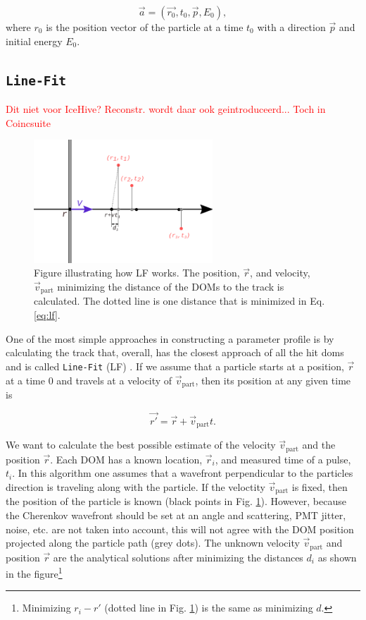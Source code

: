 \begin{equation}
\label{eq:vec}
\vec{a} = (\vec{r_0},t_0,\vec{p},E_0),
\end{equation}
\noindent where $r_0$ is the position vector of the particle at a time $t_0$ with a direction $\vec{p}$ and initial energy $E_0$. 

\subsection{\texttt{Line-Fit}}
\label{subsec:lf}
\textcolor{red}{Dit niet voor IceHive? Reconstr. wordt daar ook geintroduceerd... Toch in Coincsuite}\\

\begin{figure}
\centering
\includegraphics[width=0.6\textwidth]{chapter7/img/linefit.png}
\caption{Figure illustrating how LF works. The position, $\vec{r}$, and velocity, $\vec{v}_\textrm{part}$ minimizing the distance of the DOMs to the track is calculated. The dotted line is one distance that is minimized in Eq. \ref{eq:lf}.}
\label{fig:lf}
\end{figure}

\noindent One of the most simple approaches in constructing a parameter profile is by calculating the track that, overall, has the closest approach of all the hit doms and is called \texttt{Line-Fit} (LF) \cite{Ahrens:2003fg}. If we assume that a particle starts at a position, $\vec{r}$ at a time 0 and travels at a velocity of $\vec{v}_\textrm{part}$, then its position at any given time is

\begin{equation}
\vec{r'} = \vec{r} + \vec{v}_{\textrm{part}}t.
\end{equation}

\noindent We want to calculate the best possible estimate of the velocity $\vec{v}_\textrm{part}$ and the position $\vec{r}$. Each DOM has a known location, $\vec{r}_i$, and measured time of a pulse, $t_i$. In this algorithm one assumes that a wavefront perpendicular to the particles direction is traveling along with the particle. If the veloctity $\vec{v}_\textrm{part}$ is fixed, then the position of the particle is known (black points in Fig. \ref{fig:lf}). However, because the Cherenkov wavefront should be set at an angle and scattering, PMT jitter, noise, etc. are not taken into account, this will not agree with the DOM position projected along the particle path (grey dots). The unknown velocity $\vec{v}_\textrm{part}$ and position $\vec{r}$ are the analytical solutions after minimizing the distances $d_i$ as shown in the figure\footnote{Minimizing $r_i - r'$ (dotted line in Fig. \ref{fig:lf}) is the same as minimizing $d$.}

